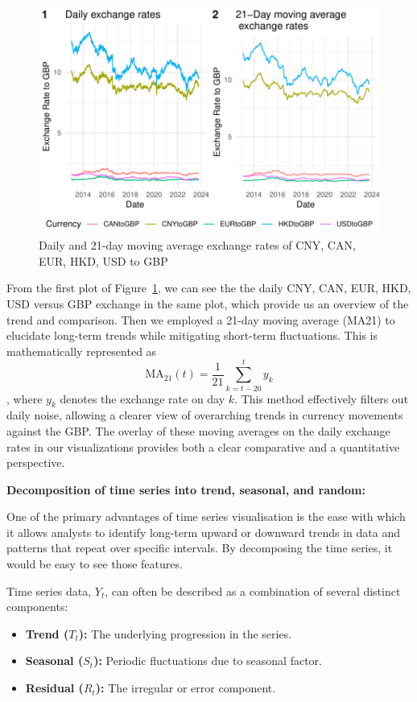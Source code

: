 \documentclass{article}\usepackage[]{graphicx}\usepackage[]{xcolor}
\makeatletter
\def\maxwidth{ %
  \ifdim\Gin@nat@width>\linewidth
    \linewidth
  \else
    \Gin@nat@width
  \fi
}
\newenvironment{knitrout}{}{} %
\makeatother
\begin{document}
\begin{figure}[H]
\begin{knitrout}
{\centering \includegraphics[width=\maxwidth]{figure/beamer-unnamed-chunk-2-1} 

}


\end{knitrout}
\centering
\caption{Daily and 21-day moving average exchange rates of CNY, CAN, EUR, HKD, USD to GBP}
\label{fig:all exchange rates}
\end{figure}

From the first plot of Figure~\ref{fig:all exchange rates}, we can see the the daily CNY, CAN, EUR, HKD, USD versus GBP exchange in the same plot, which provide us an overview of the trend and comparison. Then we employed a 21-day moving average (MA21) to elucidate long-term trends while mitigating short-term fluctuations. This is mathematically represented as 
\[\text{MA}_{21}(t) = \frac{1}{21} \sum_{k=t-20}^{t} y_k\], 
where \( y_k \) denotes the exchange rate on day \( k \). This method effectively filters out daily noise, allowing a clearer view of overarching trends in currency movements against the GBP. The overlay of these moving averages on the daily exchange rates in our visualizations provides both a clear comparative and a quantitative perspective.

\noindent
\textbf{Decomposition of time series into trend, seasonal, and random:}

One of the primary advantages of time series visualisation is the ease with which it allows analysts to identify long-term upward or downward trends in data and patterns that repeat over specific intervals. By decomposing the time series, it would be easy to see those features.

Time series data, $Y_t$, can often be described as a combination of several distinct components:
\begin{itemize}
    \item \textbf{Trend ($T_t$):} The underlying progression in the series.
    \item \textbf{Seasonal ($S_t$):} Periodic fluctuations due to seasonal factor.
    \item \textbf{Residual ($R_t$):} The irregular or error component.
\end{itemize}
\end{document}
